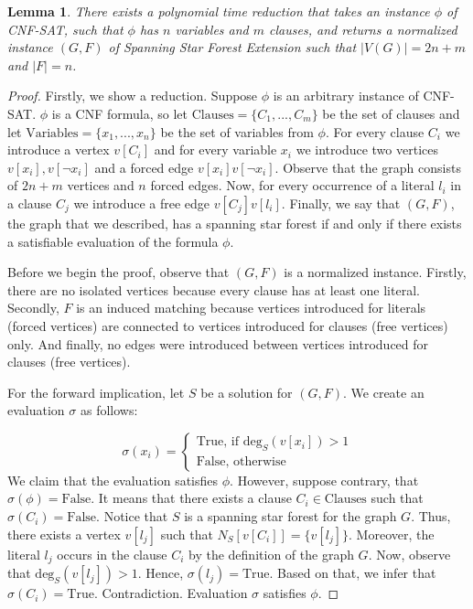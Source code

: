 \documentclass[en]{pracamgr}
\newtheorem{lemma}{Lemma}
\newcommand{\ssfep}{{\sc Spanning Star Forest Extension}}
\newcommand{\cnfsat}{{\sc CNF-SAT}}
\newcommand{\degree}[2]{\textrm{deg}_{#1}(#2)}
\begin{document}
\begin{lemma}\label{ssfep reduction}
	There exists a polynomial time reduction that takes an instance $\phi$ of \cnfsat{}, such that $\phi$ has $n$ variables and $m$ clauses, and returns a normalized instance $(G,F)$ of \ssfep{} such that $|V(G)|=2n+m$ and $|F|=n$.
\end{lemma}

\begin{proof}
	Firstly, we show a reduction. Suppose $\phi$ is an arbitrary instance of \cnfsat{}. $\phi$ is a CNF formula, so let $\textrm{Clauses}=\{C_1,...,C_m\}$ be the set of clauses and let $\textrm{Variables}=\{x_1,...,x_n\}$ be the set of variables from $\phi$. For every clause $C_i$ we introduce a vertex $v[C_i]$ and for every variable $x_i$ we introduce two vertices $v[x_i],v[\neg x_i]$ and a forced edge $v[x_i]v[\neg x_i]$. Observe that the graph consists of $2n+m$ vertices and $n$ forced edges. Now, for every occurrence of a literal $l_i$ in a clause $C_j$ we introduce a free edge $v[C_j]v[l_i]$. Finally, we say that $(G,F)$, the graph that we described, has a spanning star forest if and only if there exists a satisfiable evaluation of the formula $\phi$.
	
	Before we begin the proof, observe that $(G,F)$ is a normalized instance. Firstly, there are no isolated vertices because every clause has at least one literal. Secondly, $F$ is an induced matching because vertices introduced for literals (forced vertices) are connected to vertices introduced for clauses (free vertices) only. And finally, no edges were introduced between vertices introduced for clauses (free vertices).
	
	For the forward implication, let $S$ be a solution for $(G,F)$. We create an evaluation $\sigma$ as follows:
	
	\begin{equation*}
		\sigma(x_i) = 
		\begin{cases}
			\textrm{True}\text{, if $\degree{S}{v[x_i]} > 1$} \\
			\textrm{False}\text{, otherwise}
		\end{cases}
	\end{equation*}
	We claim that the evaluation satisfies $\phi$. However, suppose contrary, that $\sigma(\phi)=\textrm{False}$. It means that there exists a clause $C_i \in \textrm{Clauses}$ such that $\sigma(C_i)=\textrm{False}$. Notice that $S$ is a spanning star forest for the graph $G$. Thus, there exists a vertex $v[l_j]$ such that $N_S[v[C_i]] = \{v[l_j]\}$. Moreover, the literal $l_j$ occurs in the clause $C_i$ by the definition of the graph $G$. Now, observe that $\degree{S}{v[l_j]} > 1$. Hence, $\sigma(l_j)=\textrm{True}$. Based on that, we infer that $\sigma(C_i)=\textrm{True}$. Contradiction. Evaluation $\sigma$ satisfies $\phi$.
	

\end{proof}
\end{document}
